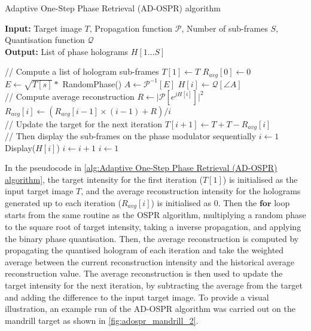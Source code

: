\begin{algorithm}[H]
  \caption{Adaptive One-Step Phase Retrieval (AD-OSPR) algorithm}\label{alg:Adaptive One-Step Phase Retrieval (AD-OSPR) algorithm}
  \textbf{Input:} Target image $T$, Propagation function $\mathcal{P}$, Number of sub-frames $S$, Quantisation function $\mathcal{Q}$\\
  \textbf{Output:} List of phase holograms $H[1\ldots S]$
  \begin{algorithmic}
    \State // Compute a list of hologram sub-frames
    \State $T[1] \gets T$
    \State $R_{avg}[0] \gets 0$
    \State $E \gets \sqrt{T[s]} *$ RandomPhase()
    \State $A \gets \mathcal{P}^{-1}[E]$
    \State $H[i] \gets \mathcal{Q}[\angle A]$\\

    \State // Compute average reconstruction
    \State $R \gets \vert \mathcal{P}[e^{jH[i]}] \vert ^2$
    \State $R_{avg}[i] \gets (R_{avg}[i-1] \times (i-1) + R)/i$\\

    \State // Update the target for the next iteration
    \State $T[i+1] \gets T + T - R_{avg}[i]$
    \EndFor\\

    \State // Then display the sub-frames on the phase modulator sequentially
    \State $i\gets 1$
    \State Display($H[i]$)
    \State $i\gets i + 1$
    \State $i\gets 1$
    \EndIf
    \EndWhile
  \end{algorithmic}
\end{algorithm}

In the pseudocode in \cref{alg:Adaptive One-Step Phase Retrieval (AD-OSPR) algorithm}, the target intensity for the first iteration ($T[1]$) is initialised as the input target image $T$, and the average reconstruction intensity for the holograms generated up to each iteration ($R_{avg}[i]$) is initialised as 0. Then the $\textbf{for}$ loop starts from the same routine as the OSPR algorithm, multiplying a random phase to the square root of target intensity, taking a inverse propagation, and applying the binary phase quantisation. Then, the average reconstruction is computed by propagating the quantised hologram of each iteration and take the weighted average between the current reconstruction intensity and the historical average reconstruction value. The average reconstruction is then used to update the target intensity for the next iteration, by subtracting the average from the target and adding the difference to the input target image. To provide a visual illustration, an example run of the AD-OSPR algorithm was carried out on the mandrill target as shown in \cref{fig:adospr_mandrill_2}.


